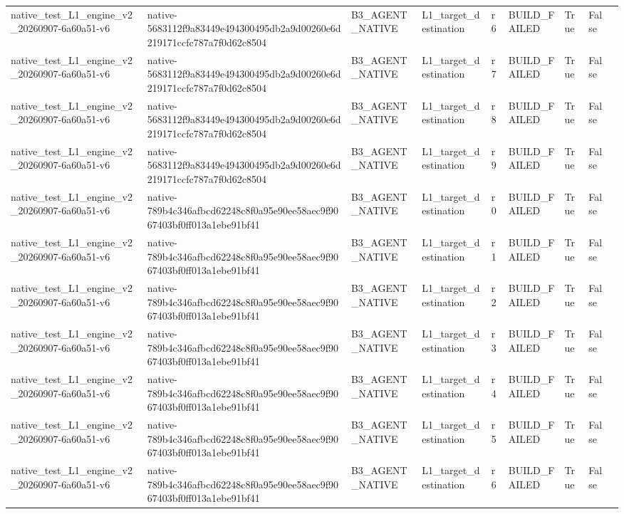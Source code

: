 \begin{tabular}{lllllllll}
native\_test\_L1\_engine\_v2\_20260907-6a60a51-v6 & native-5683112f9a83449e494300495db2a9d00260e6d219171ccfc787a7f0d62c8504 & B3\_AGENT\_NATIVE & L1\_target\_destination & r6 & BUILD\_FAILED & True & False &  \\
native\_test\_L1\_engine\_v2\_20260907-6a60a51-v6 & native-5683112f9a83449e494300495db2a9d00260e6d219171ccfc787a7f0d62c8504 & B3\_AGENT\_NATIVE & L1\_target\_destination & r7 & BUILD\_FAILED & True & False &  \\
native\_test\_L1\_engine\_v2\_20260907-6a60a51-v6 & native-5683112f9a83449e494300495db2a9d00260e6d219171ccfc787a7f0d62c8504 & B3\_AGENT\_NATIVE & L1\_target\_destination & r8 & BUILD\_FAILED & True & False &  \\
native\_test\_L1\_engine\_v2\_20260907-6a60a51-v6 & native-5683112f9a83449e494300495db2a9d00260e6d219171ccfc787a7f0d62c8504 & B3\_AGENT\_NATIVE & L1\_target\_destination & r9 & BUILD\_FAILED & True & False &  \\
native\_test\_L1\_engine\_v2\_20260907-6a60a51-v6 & native-789b4c346afbcd62248c8f0a95e90ee58aec9f9067403bf0ff013a1ebe91bf41 & B3\_AGENT\_NATIVE & L1\_target\_destination & r0 & BUILD\_FAILED & True & False &  \\
native\_test\_L1\_engine\_v2\_20260907-6a60a51-v6 & native-789b4c346afbcd62248c8f0a95e90ee58aec9f9067403bf0ff013a1ebe91bf41 & B3\_AGENT\_NATIVE & L1\_target\_destination & r1 & BUILD\_FAILED & True & False &  \\
native\_test\_L1\_engine\_v2\_20260907-6a60a51-v6 & native-789b4c346afbcd62248c8f0a95e90ee58aec9f9067403bf0ff013a1ebe91bf41 & B3\_AGENT\_NATIVE & L1\_target\_destination & r2 & BUILD\_FAILED & True & False &  \\
native\_test\_L1\_engine\_v2\_20260907-6a60a51-v6 & native-789b4c346afbcd62248c8f0a95e90ee58aec9f9067403bf0ff013a1ebe91bf41 & B3\_AGENT\_NATIVE & L1\_target\_destination & r3 & BUILD\_FAILED & True & False &  \\
native\_test\_L1\_engine\_v2\_20260907-6a60a51-v6 & native-789b4c346afbcd62248c8f0a95e90ee58aec9f9067403bf0ff013a1ebe91bf41 & B3\_AGENT\_NATIVE & L1\_target\_destination & r4 & BUILD\_FAILED & True & False &  \\
native\_test\_L1\_engine\_v2\_20260907-6a60a51-v6 & native-789b4c346afbcd62248c8f0a95e90ee58aec9f9067403bf0ff013a1ebe91bf41 & B3\_AGENT\_NATIVE & L1\_target\_destination & r5 & BUILD\_FAILED & True & False &  \\
native\_test\_L1\_engine\_v2\_20260907-6a60a51-v6 & native-789b4c346afbcd62248c8f0a95e90ee58aec9f9067403bf0ff013a1ebe91bf41 & B3\_AGENT\_NATIVE & L1\_target\_destination & r6 & BUILD\_FAILED & True & False &  \\

\end{tabular}
